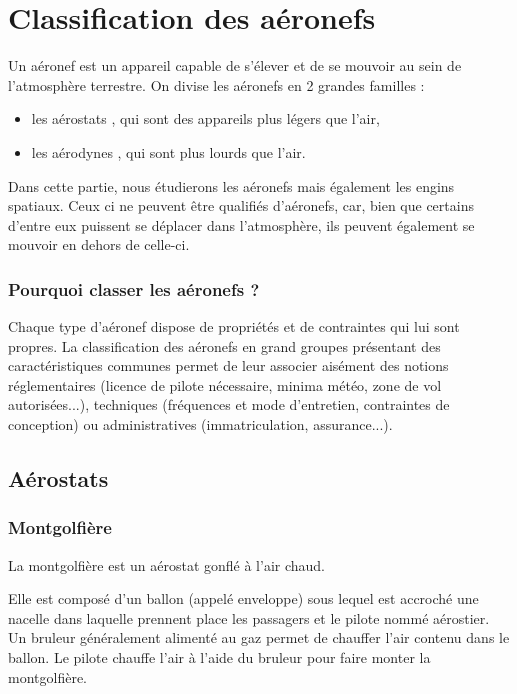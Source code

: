 \section{Classification des aéronefs}
Un \gls{aéronef}  est un appareil capable de s'élever et de se mouvoir au sein de l'atmosphère terrestre. On divise les aéronefs en 2 grandes familles :
\begin{itemize}
	\item les  \gls{aérostat}s , qui sont des appareils plus légers que l'air,
	\item les  \gls{aérodyne}s , qui sont plus lourds que l'air.
\end{itemize}

Dans cette partie, nous étudierons les aéronefs mais également les engins spatiaux. Ceux ci ne peuvent être qualifiés d'aéronefs, car, bien que certains d'entre eux puissent se déplacer dans l'atmosphère, ils peuvent également se mouvoir en dehors de celle-ci.

\subsubsection{Pourquoi classer les aéronefs ?}
Chaque type d'aéronef dispose de propriétés et de contraintes qui lui sont propres. La classification des aéronefs en grand groupes présentant des caractéristiques communes permet de leur associer aisément des notions réglementaires (licence de pilote nécessaire, minima météo, zone de vol autorisées...), techniques (fréquences et mode d'entretien, contraintes de conception) ou administratives (immatriculation, assurance...).

\subsection{Aérostats}
	\subsubsection{Montgolfière}
	La montgolfière est un aérostat gonflé à l'air chaud.
	
	Elle est composé d'un ballon (appelé enveloppe) sous lequel est accroché une nacelle dans laquelle prennent place les passagers et le pilote nommé aérostier. Un bruleur généralement alimenté au gaz permet de chauffer l'air contenu dans le ballon. Le pilote chauffe l'air à l'aide du bruleur pour faire monter la montgolfière. \\
	
